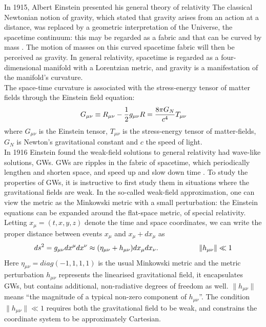 \documentclass[binding=0.6cm, LaM]{sapthesis}
\begin{document}
	In 1915, Albert Einstein presented his general theory of relativity
	The classical Newtonian notion of gravity, which stated that gravity arises from an 
	action at a distance, was replaced by a geometric interpretation of the Universe, 
	the spacetime continuum: this may be regarded as a fabric and that can be curved 
	by mass \cite{1}. 
	The motion of masses on this curved spacetime fabric will then be perceived as gravity. 
	In general relativity, spacetime is regarded as a four-dimensional manifold 
	with a Lorentzian metric, and gravity is a manifestation of the manifold’s curvature. \\
	The space-time curvature is associated with the stress-energy tensor 
	of matter fields through the Einstein field equation:
		\begin{equation}
		G_{\mu\nu} \equiv R_{\mu\nu}  - {1 \over 2}g_{\mu\nu}R = {8\pi G_{N} \over {c^4}}T_{\mu\nu} 
		\end{equation}
	where $G_{\mu\nu} $ is the Einstein tensor, $T_{\mu\nu} $ is the stress-energy 
	tensor of matter-fields, $ G_{N}$ is Newton’s gravitational constant and $c$ the speed of light. \\
	In 1916 Einstein found the weak-field solutions to general relativity had wave-like solutions, GWs.
	GWs are ripples in the fabric of spacetime, 
	which periodically lengthen and shorten space, and speed up and slow down time \cite{2}.
 	To study the properties of GWs, it is instructive to first study them 
	in situations where the gravitational fields are weak.
	In the so-called weak-field approximation, one can view the metric as the Minkowski metric 
	with a small perturbation: the Einstein equations can be expanded around the flat-space metric, of special relativity. \\
	Letting $ x_\mu = (t, x, y, z)$ denote the time and space coordinates, 
	we can write the proper distance between events $x_{\mu}$ and $x_{\mu} + dx_{\mu}$ as
		\[
		ds^2 = g_{\mu\nu}dx^{\mu}dx^{\nu} \approx (\eta_{\mu\nu} + h_{\mu\nu})dx_{\mu}dx_{\nu}. \hspace*{2cm}\|h_{\mu\nu}\|\ll 1
		\]
	Here $\eta_{\mu\nu} = diag(-1,1,1,1)$ is the usual Minkowski metric and the metric perturbation  $h_{\mu\nu}$        
	represents the linearised gravitational field, it encapsulates GWs, 
	but contains additional, non-radiative degrees of freedom as well. $\|h_{\mu\nu}\|$ means
	“the magnitude of a typical non-zero component of $h_{\mu\nu}$”. 
	The condition $\|h_{\mu\nu}\|\ll 1$ requires both the gravitational field to be weak, 
	and constrains the coordinate system to be approximately Cartesian.  \\
\end{document}
